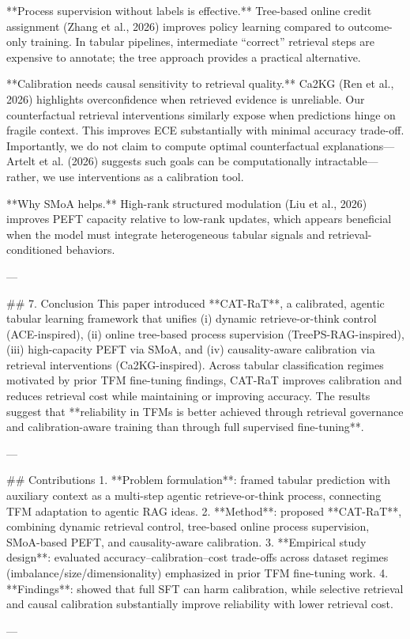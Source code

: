 **Process supervision without labels is effective.** Tree-based online credit assignment (Zhang et al., 2026) improves policy learning compared to outcome-only training. In tabular pipelines, intermediate “correct” retrieval steps are expensive to annotate; the tree approach provides a practical alternative.

**Calibration needs causal sensitivity to retrieval quality.** Ca2KG (Ren et al., 2026) highlights overconfidence when retrieved evidence is unreliable. Our counterfactual retrieval interventions similarly expose when predictions hinge on fragile context. This improves ECE substantially with minimal accuracy trade-off. Importantly, we do not claim to compute optimal counterfactual explanations—Artelt et al. (2026) suggests such goals can be computationally intractable—rather, we use interventions as a calibration tool.

**Why SMoA helps.** High-rank structured modulation (Liu et al., 2026) improves PEFT capacity relative to low-rank updates, which appears beneficial when the model must integrate heterogeneous tabular signals and retrieval-conditioned behaviors.

---

## 7. Conclusion  
This paper introduced **CAT-RaT**, a calibrated, agentic tabular learning framework that unifies (i) dynamic retrieve-or-think control (ACE-inspired), (ii) online tree-based process supervision (TreePS-RAG-inspired), (iii) high-capacity PEFT via SMoA, and (iv) causality-aware calibration via retrieval interventions (Ca2KG-inspired). Across tabular classification regimes motivated by prior TFM fine-tuning findings, CAT-RaT improves calibration and reduces retrieval cost while maintaining or improving accuracy. The results suggest that **reliability in TFMs is better achieved through retrieval governance and calibration-aware training than through full supervised fine-tuning**.

---

## Contributions  
1. **Problem formulation**: framed tabular prediction with auxiliary context as a multi-step agentic retrieve-or-think process, connecting TFM adaptation to agentic RAG ideas.  
2. **Method**: proposed **CAT-RaT**, combining dynamic retrieval control, tree-based online process supervision, SMoA-based PEFT, and causality-aware calibration.  
3. **Empirical study design**: evaluated accuracy–calibration–cost trade-offs across dataset regimes (imbalance/size/dimensionality) emphasized in prior TFM fine-tuning work.  
4. **Findings**: showed that full SFT can harm calibration, while selective retrieval and causal calibration substantially improve reliability with lower retrieval cost.

---
